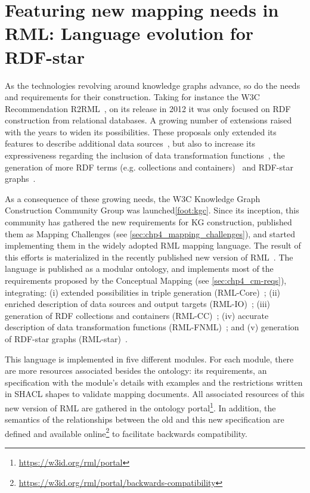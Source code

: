 \section{Featuring new mapping needs in RML: Language evolution for RDF-star}
\label{sec:chp4_rml_star}

As the technologies revolving around knowledge graphs advance, so do the needs and requirements for their construction. Taking for instance the W3C Recommendation R2RML~\parencite{das2012r2rml}, on its release in 2012 it was only focused on RDF construction from relational databases. A growing number of extensions raised with the years to widen its possibilities. These proposals only extended its features to describe additional data sources~\parencite{DBLP:conf/webist/MichelDFM15,VanAssche2021LeveragingWebThings}, but also to increase its expressiveness regarding the inclusion of data transformation functions~\parencite{de2020implementation,debruyne2016r2rmlf,junior2016funul,kyzirakos2018geotriples}, the generation of more RDF terms (e.g. collections and containers)~\parencite{DBLP:conf/webist/MichelDFM15,debruyne2017R2RML-collections} and RDF-star graphs~\parencite{delva2021rml-star,sundqvist2022extending}. 

As a consequence of these growing needs, the W3C Knowledge Graph Construction Community Group was launched\cref{foot:kgc}. Since its inception, this community has gathered the new requirements for KG construction, published them as Mapping Challenges (see \cref{sec:chp4_mapping_challenges}), and started implementing them in the widely adopted RML mapping language. The result of this efforts is materialized in the recently published new version of RML~\parencite{iglesias2023rml}. The language is published as a modular ontology, and implements most of the requirements proposed by the Conceptual Mapping (see \cref{sec:chp4_cm-reqs}), integrating: (i) extended possibilities in triple generation (RML-Core)~\parencite{core_ontology}; (ii) enriched description of data sources and output targets (RML-IO)~\parencite{io_ontology}; (iii) generation of RDF collections and containers (RML-CC)~\parencite{cc_ontology}; (iv) accurate description of data transformation functions (RML-FNML)~\parencite{fnml_ontology}; and (v) generation of RDF-star graphs (RML-star)~\parencite{star_ontology}.

This language is implemented in five different modules. 
For each module, there are more resources associated besides the ontology: its requirements, an specification with the module's details with examples and the restrictions written in SHACL shapes to validate mapping documents. 
All associated resources of this new version of RML are gathered in the ontology portal\footnote{\url{https://w3id.org/rml/portal}}. 
In addition, the semantics of the relationships between the old and this new specification are defined and available online\footnote{\url{https://w3id.org/rml/portal/backwards-compatibility}} to facilitate backwards compatibility.

